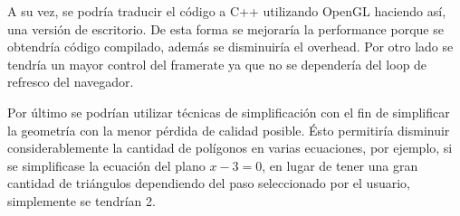 \documentclass[12pt]{article}
\begin{document}
A su vez, se podría traducir el código a C++ utilizando OpenGL haciendo así, una versión de escritorio. De esta forma se mejoraría la performance porque se obtendría código compilado, además se disminuiría el overhead. Por otro lado se tendría un mayor control del framerate ya que no se dependería del loop de refresco del navegador.

Por último se podrían utilizar técnicas de simplificación\cite{simplificacion}\cite{realtimerendering} con el fin de simplificar la geometría con la menor pérdida de calidad posible. Ésto permitiría disminuir considerablemente la cantidad de polígonos en varias ecuaciones, por ejemplo, si se simplificase la ecuación del plano $x-3=0$, en lugar de tener una gran cantidad de triángulos dependiendo del paso seleccionado por el usuario, simplemente se tendrían 2.

\clearpage
\end{document}
